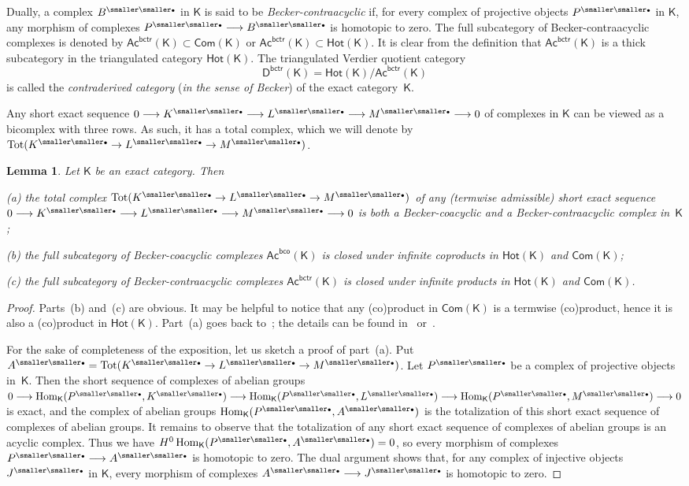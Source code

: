 \documentclass[12pt,a4paper]{amsart}
\newcommand{\+}{\nobreakdash-}
\renewcommand{\:}{\colon}
\newcommand{\rarrow}{\longrightarrow}
\newcommand{\bu}{{\text{\smaller\smaller$\scriptstyle\bullet$}}}
\DeclareMathOperator{\Hom}{Hom}
\DeclareMathOperator{\Tot}{Tot}
\newcommand{\sD}{\mathsf D}
\newcommand{\sK}{\mathsf K}
\newcommand{\Hot}{\mathsf{Hot}}
\newcommand{\Com}{\mathsf{Com}}
\newcommand{\Ac}{\mathsf{Ac}}
\newcommand{\bco}{\mathsf{bco}}
\newcommand{\bctr}{\mathsf{bctr}}
\theoremstyle{plain}
\newtheorem{lem}[thm]{Lemma}
\theoremstyle{definition}
\begin{document}
 Dually, a complex $B^\bu$ in $\sK$ is said to be
\emph{Becker-contraacyclic} if, for every complex of projective objects
$P^\bu$ in $\sK$, any morphism of complexes $P^\bu\rarrow B^\bu$ is
homotopic to zero.
 The full subcategory of Becker-contraacyclic complexes is denoted by
$\Ac^\bctr(\sK)\subset\Com(\sK)$ or $\Ac^\bctr(\sK)\subset\Hot(\sK)$.
 It is clear from the definition that $\Ac^\bctr(\sK)$ is a thick
subcategory in the triangulated category $\Hot(\sK)$.
 The triangulated Verdier quotient category
$$
 \sD^\bctr(\sK)=\Hot(\sK)/\Ac^\bctr(\sK)
$$
is called the \emph{contraderived category} (\emph{in the sense of
Becker}) of the exact category~$\sK$.

 Any short exact sequence $0\rarrow K^\bu\rarrow L^\bu\rarrow M^\bu
\rarrow0$ of complexes in $\sK$ can be viewed as a bicomplex with
three rows.
 As such, it has a total complex, which we will denote by
$\Tot(K^\bu\to L^\bu\to M^\bu)$.

\begin{lem} \label{totalizations-are-co-contra-acyclic}
 Let\/ $\sK$ be an exact category.
 Then \par
\textup{(a)} the total complex\/ $\Tot(K^\bu\to L^\bu\to M^\bu)$ of
any (termwise admissible) short exact sequence $0\rarrow K^\bu\rarrow
L^\bu\rarrow M^\bu\rarrow0$ is both a Becker-coacyclic and
a Becker-contraacyclic complex in\/~$\sK$; \par
\textup{(b)} the full subcategory of Becker-coacyclic complexes\/
$\Ac^\bco(\sK)$ is closed under infinite coproducts in\/ $\Hot(\sK)$
and\/ $\Com(\sK)$; \par
\textup{(c)} the full subcategory of Becker-contraacyclic complexes\/
$\Ac^\bctr(\sK)$ is closed under infinite products in\/ $\Hot(\sK)$
and\/ $\Com(\sK)$.
\end{lem}

\begin{proof}
 Parts~(b) and~(c) are obvious.
 It may be helpful to notice that any (co)product in $\Com(\sK)$ is
a termwise (co)product, hence it is also a (co)product in $\Hot(\sK)$.
 Part~(a) goes back to~\cite[Theorem~3.5 and Remark~3.5]{Pkoszul};
the details can be found in~\cite[Lemmas~7.1 and~9.1]{PS4}
or~\cite[Lemmas~A.1.4 and B.7.1(a)]{Pcosh}.

 For the sake of completeness of the exposition, let us sketch
a proof of part~(a).
 Put $A^\bu=\Tot(K^\bu\to L^\bu\to M^\bu)$.
 Let $P^\bu$ be a complex of projective objects in~$\sK$.
 Then the short sequence of complexes of abelian groups
$0\rarrow\Hom_\sK(P^\bu,K^\bu)\rarrow\Hom_\sK(P^\bu,L^\bu)\rarrow
\Hom_\sK(P^\bu,M^\bu)\rarrow0$ is exact, and the complex of abelian
groups $\Hom_\sK(P^\bu,A^\bu)$ is the totalization of this short exact
sequence of complexes of abelian groups.
 It remains to observe that the totalization of any short exact
sequence of complexes of abelian groups is an acyclic complex.
 Thus we have $H^0\Hom_\sK(P^\bu,A^\bu)=0$, so every morphism of
complexes $P^\bu\rarrow A^\bu$ is homotopic to zero.
 The dual argument shows that, for any complex of injective objects
$J^\bu$ in $\sK$, every morphism of complexes $A^\bu\rarrow J^\bu$
is homotopic to zero.
\end{proof}
\end{document}
